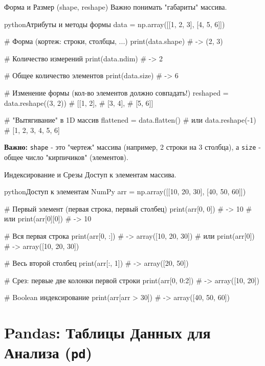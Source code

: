 \begin{myblock}{{Форма и Размер (shape, reshape)}}
    Важно понимать "габариты" массива.
    \begin{codebox}{python}{Атрибуты и методы формы}
    data = np.array([[1, 2, 3], [4, 5, 6]])

    # Форма (кортеж: строки, столбцы, ...)
    print(data.shape)  # -> (2, 3)

    # Количество измерений
    print(data.ndim)   # -> 2

    # Общее количество элементов
    print(data.size)   # -> 6

    # Изменение формы (кол-во элементов должно совпадать!)
    reshaped = data.reshape((3, 2))
    # [[1, 2],
    #  [3, 4],
    #  [5, 6]]

    # "Вытягивание" в 1D массив
    flattened = data.flatten() # или data.reshape(-1)
    # [1, 2, 3, 4, 5, 6]
    \end{codebox}
    \textbf{Важно:} \texttt{shape} - это "чертеж" массива (например, 2 строки на 3 столбца), а \texttt{size} - общее число "кирпичиков" (элементов).
\end{myblock}

\begin{myblock}{{Индексирование и Срезы}} %
    Доступ к элементам массива.
    \begin{codebox}{python}{Доступ к элементам NumPy}
    arr = np.array([[10, 20, 30], [40, 50, 60]])

    # Первый элемент (первая строка, первый столбец)
    print(arr[0, 0]) # -> 10
    # или
    print(arr[0][0]) # -> 10

    # Вся первая строка
    print(arr[0, :]) # -> array([10, 20, 30])
    # или
    print(arr[0])    # -> array([10, 20, 30])

    # Весь второй столбец
    print(arr[:, 1]) # -> array([20, 50])

    # Срез: первые две колонки первой строки
    print(arr[0, 0:2]) # -> array([10, 20])

    # Boolean индексирование
    print(arr[arr > 30]) # -> array([40, 50, 60])
    \end{codebox}
\end{myblock}

\section{Pandas: Таблицы Данных для Анализа (\texttt{pd})}

